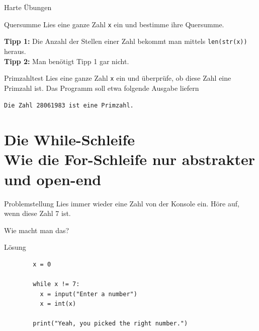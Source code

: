 \documentclass[algorithm,pgfplots,colortheme=dark]{cuzbeamer}
\newcommand{\py}[1]{\texttt{#1}}
\begin{document}
\begin{frame}{Harte Übungen}

\begin{block}{Quersumme}
	\vspace{2pt}
	Lies eine ganze Zahl \py{x} ein und bestimme ihre Quersumme. 
	
	\textbf{Tipp 1:} Die Anzahl der Stellen einer Zahl bekommt man mittels \py{len(str(x))} heraus. \\
	\textbf{Tipp 2:} Man benötigt Tipp 1 gar nicht.  
	
\end{block}

\vspace{12pt}
\pause

\begin{block}{Primzahltest}
	\vspace{2pt}
	Lies eine ganze Zahl \py{x} ein und überprüfe, ob diese Zahl eine Primzahl ist. Das Programm soll etwa folgende Ausgabe liefern 
	
	\texttt{Die Zahl 28061983 ist eine Primzahl.}
\end{block}

\end{frame}


\section{Die While-Schleife \\ \footnotesize Wie die For-Schleife nur abstrakter und open-end}

\begin{frame}
\begin{block}{Problemstellung}
	\vspace{2pt}
	Lies immer wieder eine Zahl von der Konsole ein. Höre auf, wenn diese Zahl 7 ist. 
	
	Wie macht man das? 
\end{block}
\end{frame}

\begin{fragile}
	
\begin{block}{Lösung}
		\vspace{2pt}
		
	\begin{verbatim}
		x = 0
		
		while x != 7: 
		  x = input("Enter a number")
		  x = int(x)
		  
		print("Yeah, you picked the right number.")
	\end{verbatim}
	
\end{block}
\end{fragile}
\end{document}
